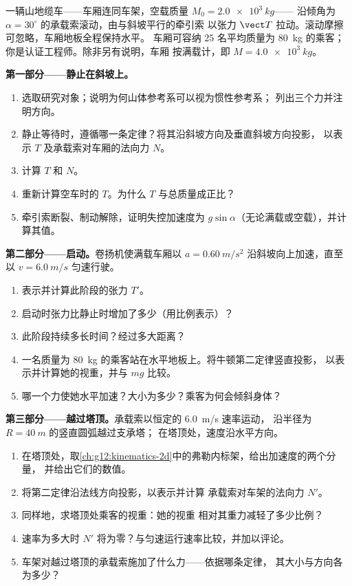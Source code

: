 \begin{problem}
\label{pb:g12:newtons-laws:1}
一辆山地缆车——车厢连同车架，空载质量 $M_0 = \qty{2.0e3}{kg}$——
沿倾角为 $\alpha = 30^\circ$ 的承载索滚动，由与斜坡平行的牵引索
以张力 $\vect T$ 拉动。滚动摩擦可忽略，车厢地板全程保持水平。
车厢可容纳 $25$ 名平均质量为
\qty{80}{kg} 的乘客；你是认证工程师。除非另有说明，车厢
按满载计，即 $M = \qty{4.0e3}{kg}$。

\medskip
\noindent\textbf{第一部分——静止在斜坡上。}
\begin{enumerate}
  \item 选取研究对象；说明为何山体参考系可以视为惯性参考系；
        列出三个力并注明方向。
  \item 静止等待时，遵循哪一条定律？将其沿斜坡方向及垂直斜坡方向投影，
        以表示 $T$ 及承载索对车厢的法向力 $N$。
  \item 计算 $T$ 和 $N$。
  \item 重新计算空车时的 $T$。为什么 $T$ 与总质量成正比？
  \item 牵引索断裂、制动解除，证明失控加速度为
        $g \sin\alpha$（无论满载或空载），并计算其值。
\end{enumerate}

\medskip
\noindent\textbf{第二部分——启动。}卷扬机使满载车厢以
$a = \qty{0.60}{m/s^2}$ 沿斜坡向上加速，直至以 $v = \qty{6.0}{m/s}$ 匀速行驶。
\begin{enumerate}[resume]
  \item 表示并计算此阶段的张力 $T'$。
  \item 启动时张力比静止时增加了多少（用比例表示）？
  \item 此阶段持续多长时间？经过多大距离？
  \item 一名质量为 \qty{80}{kg} 的乘客站在水平地板上。将牛顿第二定律竖直投影，
        以表示并计算她的视重，并与 $mg$ 比较。
  \item 哪一个力使她水平加速？大小为多少？乘客为何会倾斜身体？
\end{enumerate}

\medskip
\noindent\textbf{第三部分——越过塔顶。}承载索以恒定的 \qty{6.0}{m/s} 速率运动，
沿半径为 $R = \qty{40}{m}$ 的竖直圆弧越过支承塔；
在塔顶处，速度沿水平方向。
\begin{enumerate}[resume]
  \item 在塔顶处，取\cref{ch:g12:kinematics-2d}中的弗勒内标架，给出加速度的两个分量，
        并给出它们的数值。
  \item 将第二定律沿法线方向投影，以表示并计算
        承载索对车架的法向力 $N'$。
  \item 同样地，求塔顶处乘客的视重：她的视重
        相对其重力减轻了多少比例？
  \item 速率为多大时 $N'$ 将为零？与匀速运行速率比较，并加以评论。
  \item 车架对越过塔顶的承载索施加了什么力——依据哪条定律，
        其大小与方向各为多少？
\end{enumerate}


\end{problem}
